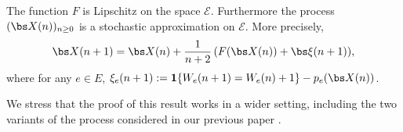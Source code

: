 \begin{proposition}\label{prop.stoc.approx}
The function $F$ is Lipschitz on the space $\mathcal E$. Furthermore the process $(\bs X(n))_{n\ge 0}$ is a stochastic approximation on $\mathcal E$. More precisely,
\begin{equation}\label{stoc.algo.weights}
\bs X(n+1) = \bs X(n) + \frac{1}{n+2}\,(F(\bs X(n)) + \bs \xi(n+1)),
\end{equation}
where for any $e\in E$, $\xi_e(n+1) := {\mathbf 1}\{W_e(n+1) = W_e(n) +1\} - p_e(\bs X(n))$.
\end{proposition}
\begin{remark} We stress that the proof of this result works in a wider setting, including the two variants of the process considered in our previous paper \cite{KMS}.
\end{remark}
